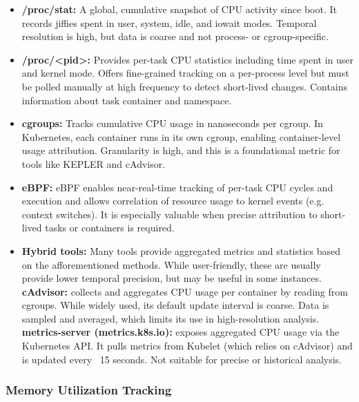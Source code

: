 \begin{itemize}
    \item \textbf{/proc/stat:} A global, cumulative snapshot of CPU activity since boot. It records jiffies spent in user, system, idle, and iowait modes. Temporal resolution is high, but data is coarse and not process- or cgroup-specific.
    \item \textbf{/proc/\textless pid\textgreater :} Provides per-task CPU statistics including time spent in user and kernel mode. Offers fine-grained tracking on a per-process level but must be polled manually at high frequency to detect short-lived changes. Contains information about task container and namespace.
    \item \textbf{cgroups:} Tracks cumulative CPU usage in nanoseconds per cgroup. In Kubernetes, each container runs in its own cgroup, enabling container-level usage attribution. Granularity is high, and this is a foundational metric for tools like KEPLER and cAdvisor.
    \item \textbf{eBPF:} eBPF enables near-real-time tracking of per-task CPU cycles and execution and allows correlation of resource usage to kernel events (e.g. context switches). It is especially valuable when precise attribution to short-lived tasks or containers is required.
    \item \textbf{Hybrid tools:} Many tools provide aggregated metrics and statistics based on the afforementioned methods. While user-friendly, these are usually provide lower temporal precision, but may be useful in some instances. \textbf{cAdvisor:} collects and aggregates CPU usage per container by reading from cgroups. While widely used, its default update interval is coarse. Data is sampled and averaged, which limits its use in high-resolution analysis. \textbf{metrics-server (metrics.k8s.io):} exposes aggregated CPU usage via the Kubernetes API. It pulls metrics from Kubelet (which relies on cAdvisor) and is updated every ~15 seconds. Not suitable for precise or historical analysis.
\end{itemize}

\subsubsection{Memory Utilization Tracking}

